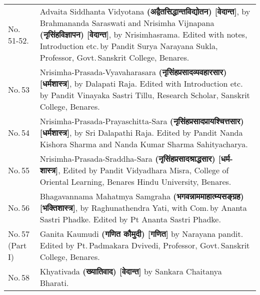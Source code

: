 \documentclass[11pt, openany]{book}
\begin{document}
\begin{longtable}{ p{} p{} } 
No.\,51-52. & Advaita Siddhanta Vidyotana \textbf{(अद्वैतसिद्धान्तविद्योतन) [वेदान्त]}, by Brahmananda Saraswati \newline \hspace{10mm} and \newline Nrisimha Vijnapana \textbf{(नृसिंहविज्ञापन) [वेदान्त]}, by Nrisimhasrama. \newline Edited with notes, Introduction etc.\,by Pandit Surya Narayana Sukla, Professor, Govt.\,Sanskrit College, Benares.\\
No.\,53 & Nrisimha-Prasada-Vyavaharasara \textbf{(नृसिंहप्रसादव्यवहारसार) [धर्मशास्त्र]}, by Dalapati Raja. \newline Edited with Introduction etc.\,by Pandit Vinayaka Sastri Tillu, Research Scholar, Sanskrit College, Benares.\\
No.\,54 & Nrisimha-Prasada-Prayaschitta-Sara \textbf{(नृसिंहप्रसादप्रायश्चित्तसार) [धर्मशास्त्र]}, by Sri Dalapathi Raja. \newline Edited by Pandit Nanda Kishora Sharma and Nanda Kumar Sharma Sahityacharya.\\
No.\,55 & Nrisimha-Prasada-Sraddha-Sara \textbf{(नृसिंहप्रसादश्राद्धसार) [धर्म-शास्त्र]}, \newline Edited by Pandit Vidyadhara Misra, College of Oriental Learning, Benares Hindu University, Benares.\\
No.\,56 & Bhagavannama Mahatmya Samgraha \textbf{(भगवन्नाममाहात्म्यसङ्ग्रह) [भक्तिशास्त्र]}, by Raghunathendra Yati, with Com.\,by Ananta Sastri Phadke. \newline Edited by Pt Ananta Sastri Phadke.\\
No.\,57 \newline (Part I) & Ganita Kaumudi \textbf{(गणित कौमुदी) [गणित]} by Narayana pandit. \newline Edited by Pt.\,Padmakara Dvivedi, Professor, Govt.\,Sanskrit College, Benares.\\
No.\,58 & Khyativada \textbf{(ख्यातिवाद) [वेदान्त]} by Sankara Chaitanya Bharati.
\end{longtable}

\newpage
\end{document}
